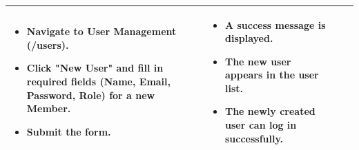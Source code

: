 \begin{longtable}{|>{\scriptsize\raggedright\arraybackslash}p{3cm}|>{\raggedright\arraybackslash}p{3.5cm}|>{\raggedright\arraybackslash}p{4.5cm}|>{\raggedright\arraybackslash}p{4.5cm}|}
\begin{itemize}[noitemsep, topsep=0pt, partopsep=0pt, leftmargin=*]
        \item Navigate to User Management (/users). 
        \item Click "New User" and fill in required fields (Name, Email, Password, Role) for a new Member. 
        \item Submit the form.
    \end{itemize} & 
    \begin{itemize}[noitemsep, topsep=0pt, partopsep=0pt, leftmargin=*]
        \item A success message is displayed. 
        \item The new user appears in the user list. 
        \item The newly created user can log in successfully.
    \end{itemize} \\ \hline


\end{longtable}

